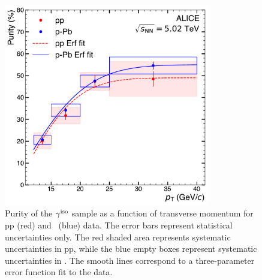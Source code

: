 

\begin{figure}[hbtp]
\center
\includegraphics[width=0.8\textwidth]{Data_Analysis/Purity/purity.pdf}
\caption{Purity of the $\gamma^\mathrm{iso}$ sample as a function of transverse momentum for pp (red) and \pPb~(blue) data. The error bars represent statistical uncertainties only. The red shaded area represents systematic uncertainties in pp, while the blue empty boxes represent systematic uncertainties in \pPb. The smooth lines correspond to a three-parameter error function fit to the data.}
\label{fig:purityresults}
\end{figure}

